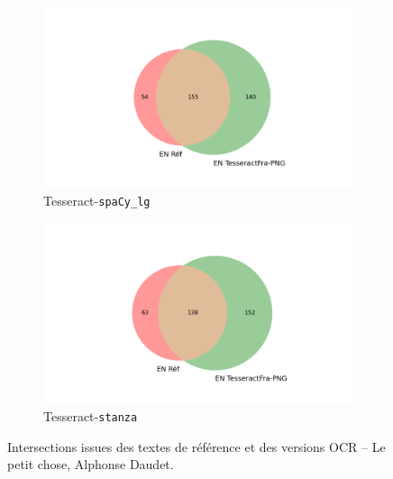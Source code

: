 \begin{figure}
\begin{minipage}{7cm}
\begin{subfigure}{0.99\textwidth}
  \label{fig:}
  \end{subfigure}
  \end{minipage}
  \begin{minipage}{7cm}
  \begin{subfigure}{0.99\textwidth}
  \includegraphics[width=.99\textwidth]{IMAGES/ELTeC_INTERSECTIONS_spaCy3.5.1/DAUDET_petit-chose_TesseractFra-PNG.txt_spacy-lg-concat.json_intersection.png} 
  \caption{Tesseract-\texttt{spaCy\_lg}}
  \label{fig:}
  \end{subfigure}
    \end{minipage}
  \begin{minipage}{7cm}
  \begin{subfigure}{0.99\textwidth}
  \includegraphics[width=.99\textwidth]{IMAGES/ELTeC_INTERSECTIONS_stanza/DAUDET_petit-chose_TesseractFra-PNG.txt_stanza-concat.json_intersection.png}
   \caption{Tesseract-\texttt{stanza}}
  \label{fig:}
  \end{subfigure}
  \end{minipage}
\caption{Intersections issues des textes de référence et des versions OCR -- {\normalfont Le petit chose}, Alphonse Daudet.}
\label{fig:DAUDET_INTERSECTIONS}
\end{figure}



